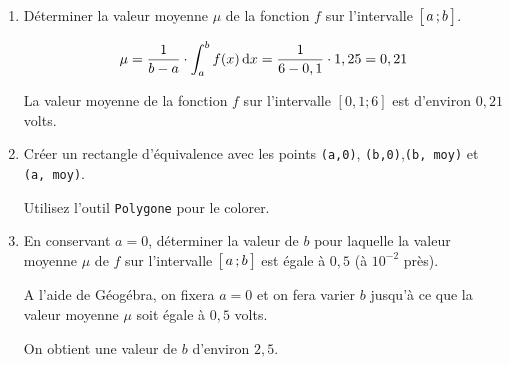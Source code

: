 \documentclass[11pt, a4paper]{report}
\begin{document}
\begin{enumerate}[resume]
    \item Déterminer la valeur moyenne $\mu$ de la fonction $f$ sur l'intervalle $\bigl[ \, a \, ; b \,\bigl]$.
    \begin{blocvisible}[height=3]
        \[\mu = \frac{1}{b-a}\cdot \int_a^b f(x) \,\mathrm{d}x = \frac{1}{6-0,1} \cdot 1,25 = 0,21\]

        La valeur moyenne de la fonction $f$ sur l'intervalle $[0,1 ; 6]$ est d'environ $0,21$ volts.
    \end{blocvisible}

    \item Créer un rectangle d'équivalence avec les points \verb|(a,0)|, \verb|(b,0)|,\verb|(b, moy)| et \verb|(a, moy)|. 
    
    Utilisez l'outil \verb|Polygone| pour le colorer. 

    \item En conservant $a=0$, déterminer la valeur de $b$ pour laquelle la valeur moyenne $\mu$ de $f$ sur l'intervalle $\bigl[ \, a \, ; b \,\bigl]$ est égale à $0,5$  (à $10^{-2}$ près). 
    \begin{blocvisible}[height=3]
        A l'aide de Géogébra, on fixera $a=0$ et on fera varier $b$ jusqu'à ce que la valeur moyenne $\mu$ soit égale à $0,5$ volts.

        On obtient une valeur de $b$ d'environ $2,5$.
    \end{blocvisible}
\end{enumerate}

         
\end{document}
